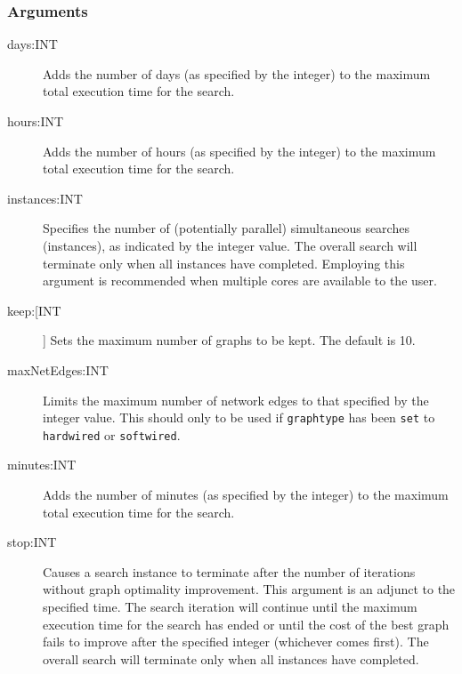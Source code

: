 	\subsubsection{Arguments}
	\begin{description}
	
		\item[days:INT] Adds the number of days (as specified by the integer) to the 
		maximum total execution time for the search.
		
		\item[hours:INT] Adds the number of hours (as specified by the integer) to the 
		maximum total execution time for the search.
		
		\item[instances:INT] Specifies the number of (potentially parallel) simultaneous
		searches (instances), as indicated by the integer value. The overall search will 
		terminate only when all instances have completed. Employing this argument is
		recommended when multiple cores are available to the user.
		
		\item[keep:[INT]] Sets the maximum number of graphs to be kept. The default 
		is 10.

		
		\item[maxNetEdges:INT] Limits the maximum number of network edges to that
		specified by the integer value. This should only to be used if \texttt{graphtype}
		has been \texttt{set} to \texttt{hardwired} or \texttt{softwired}. 
		
		\item[minutes:INT] Adds the number of minutes (as specified by the integer) to 
		the maximum total execution time for the search.
		
		

		\item[stop:INT] Causes a search instance to terminate after the number of iterations 
		without graph optimality improvement. This argument is an adjunct to the specified 
		time. The search iteration will continue until the maximum execution time for the search 
		has ended or until the cost of the best graph fails to improve after the specified integer 
		(whichever comes first). The overall search will terminate only when all instances have 
		completed.
		

\end{description}
